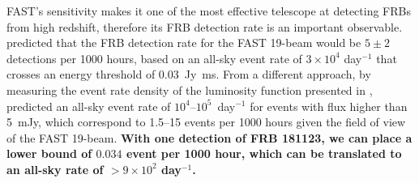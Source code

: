 FAST's sensitivity makes it one of the most effective telescope at detecting FRBs from high redshift, therefore its FRB detection rate is an important observable. 
\citet{lhz+17} predicted that the FRB detection rate for the FAST 19-beam would be $5\pm2$ detections per 1000 hours, based on an all-sky event rate of $3\times10^4$ day$^{-1}$ that crosses an energy threshold of 0.03~Jy~ms.
From a different approach, by measuring the event rate density of the luminosity function presented in \citet{lllz18}, \citet{lml+20} predicted an all-sky event rate of $10^4$--$10^5$~day$^{-1}$ for events with flux higher than 5~mJy, which correspond to 1.5--15 events per 1000 hours given the field of view of the FAST 19-beam.
{\bf With one detection of FRB 181123, we 
can place a lower bound of $0.034$ event per 1000 hour,
which can be translated to an all-sky rate of $>9\times10^2$ day$^{-1}$. }


